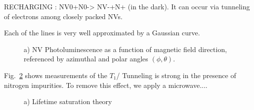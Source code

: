 \documentclass[preprintnumbers,amsmath,amssymb,twocolumn]{revtex4-1}
\begin{document}
RECHARGING  : 
NV0+N0-> NV-+N+ (in the dark). 
It can occur via tunneling of electrons among closely packed NVs. 

Each of the lines is very well approximated by a Gaussian curve.


\begin{figure}[!ht]
  \caption{a) 
NV Photoluminescence as a function of magnetic field direction, referenced by azimuthal and polar angles $(\phi, \theta)$.  }\label{Map}
\end{figure}

Fig.~\ref{T1} shows measurements of the $T_1$/ Tunneling is strong in the presence of nitrogen impurities. 
To remove this effect, we apply a microwave....

\begin{figure}[!ht]
  \caption{a) 
Lifetime saturation theory
 }\label{T1}
\end{figure}
\end{document}
